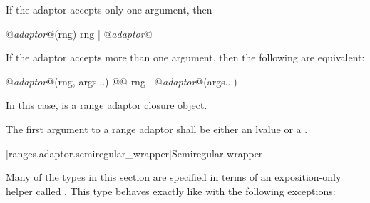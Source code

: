 \pnum
If the adaptor accepts only one argument, then 

\begin{removedblock}
\begin{codeblock}
@\textit{adaptor}@(rng)
rng | @\textit{adaptor}@
\end{codeblock}
\end{removedblock}

\pnum
If the adaptor accepts more than one argument, then the following  are  equivalent:

\begin{codeblock}
@\textit{adaptor}@(rng, args...)
@@
rng | @\textit{adaptor}@(args...)
\end{codeblock}

\begin{addedblock}
In this case,  is a range adaptor closure object.
\end{addedblock}

\begin{removedblock}
\pnum
The first argument to a range adaptor shall be either an lvalue
 or a .
\end{removedblock}

[ranges.adaptor.semiregular_wrapper]{Semiregular wrapper}

\pnum
Many of the types in this section are specified in terms of an exposition-only helper
called . This type behaves exactly like 
with the following exceptions:

